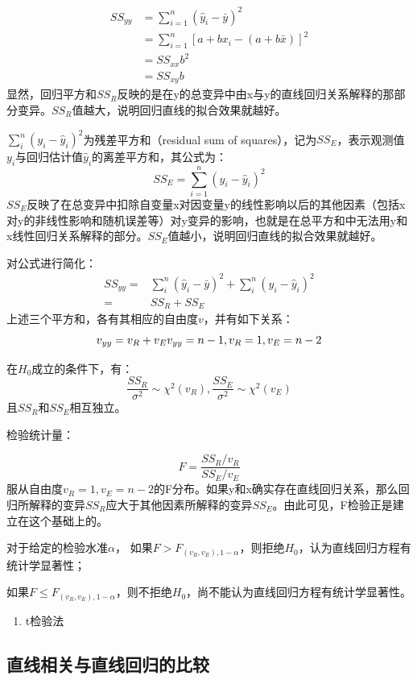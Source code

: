 \documentclass[
  letterpaper,
  DIV=11,
  numbers=noendperiod]{scrartcl}
\providecommand{\tightlist}{%
  \setlength{\itemsep}{0pt}\setlength{\parskip}{0pt}}\usepackage{longtable,booktabs,array}
\begin{document}
\[
\begin{align}
SS_{yy} &= \sum_{i=1}^{n}(\hat y_i - \bar y)^2 \\
        &= \sum_{i=1}^{n}[a + bx_i - (a + b\bar x)]^2 \\
        &= SS_{xx}b^2 \\
        &= SS_{xy}b
\end{align}
\]
显然，回归平方和\(SS_{R}\)反映的是在y的总变异中由x与y的直线回归关系解释的那部分变异。\(SS_R\)值越大，说明回归直线的拟合效果就越好。

\(\sum_{i}^{n}(y_i-\hat y_i)^2\)为残差平方和（residual sum of
squares），记为\(SS_E\)，表示观测值\(y_i\)与回归估计值\(\hat y_i\)的离差平方和，其公式为：
\[SS_E=\sum_{i=1}^{n}(y_i-\hat y_i)^2\]
\(SS_E\)反映了在总变异中扣除自变量x对因变量y的线性影响以后的其他因素（包括x对y的非线性影响和随机误差等）对y变异的影响，也就是在总平方和中无法用y和x线性回归关系解释的部分。\(SS_E\)值越小，说明回归直线的拟合效果就越好。

对公式进行简化： \[\begin{align}
SS_{yy}=&\sum_{i}^{n}(\hat y_i-\bar y)^2+\sum_{i}^{n}(y_i-\hat y_i)^2\\
=&SS_R+SS_E
\end{align}\] 上述三个平方和，各有其相应的自由度\(v\)，并有如下关系：
\[v_{yy}=v_R+v_E\\
v_{yy}=n-1,v_R=1,v_E=n-2\]

在\(H_0\)成立的条件下，有：
\[\frac{SS_R}{\sigma^2}\sim \chi^2(v_R),\frac{SS_E}{\sigma^2}\sim \chi^2(v_E)\]
且\(SS_R\)和\(SS_E\)相互独立。

检验统计量：

\[F=\frac{SS_R/v_R}{SS_E/v_E}\]
服从自由度\(v_R=1,v_E=n-2\)的F分布。如果y和x确实存在直线回归关系，那么回归所解释的变异\(SS_R\)应大于其他因素所解释的变异\(SS_E\)。由此可见，F检验正是建立在这个基础上的。

对于给定的检验水准\(\alpha\)，
如果\(F>F_{(v_R,v_E),1-\alpha}\)，则拒绝\(H_0\)，认为直线回归方程有统计学显著性；

如果\(F\leq F_{(v_R,v_E),1-\alpha}\)，则不拒绝\(H_0\)，尚不能认为直线回归方程有统计学显著性。

\begin{enumerate}
\def\labelenumi{\arabic{enumi}.}
\setcounter{enumi}{1}
\tightlist
\item
  t检验法
\end{enumerate}

\subsection{直线相关与直线回归的比较}\label{ux76f4ux7ebfux76f8ux5173ux4e0eux76f4ux7ebfux56deux5f52ux7684ux6bd4ux8f83}
\end{document}
